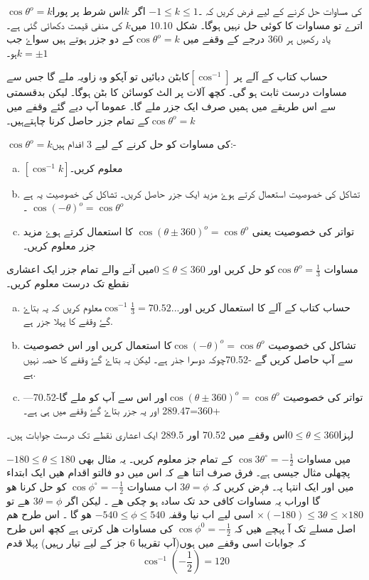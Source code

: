 \(\cos \theta^o = k\)کی مساوات حل کرنے کے لیے فرض کریں کہ ۔\(-1 \leq k \leq 1\)
 اگر \(k\)اس شرط پر پورا اترے تو مساوات کا کوئی حل نہیں ہوگا۔ شکل 10.10 میں\(k\) کی منفی قیمت دکھائی گئی ہے۔ یاد رکھیں ہر 360 درجے کے وقفے میں \(\cos \theta^o = k\)کے دو جزر ہوتے ہیں سواۓ جب \(k= \pm 1\)ہو۔

حساب کتاب کے آلے پر \([\cos^{-1}]\)کابٹن دبائیں تو آپکو وہ زاویہ ملے گا جس سے مساوات درست ثابت ہو گی۔ کچھ آلات پر الٹ کوسائن کا بٹن ہوگا۔ لیکن بدقسمتی سے اس طریقے میں ہمیں صرف ایک جزر ملے گا۔ عموما آپ  دیے گئے وقفے میں  \(\cos \theta^o = k\)کے تمام جزر حاصل کرنا چاہتےہیں۔

 \(\cos \theta^o = k\)کی مساوات کو حل کرنے کے لیے 3 افدام ہیں:-

\begin{enumerate}[a.]
\item
\([\cos^{-1}k]\)معلوم کریں۔
\item
 تشاکل کی خصوصیت استعمال کرتے ہوۓ مزید ایک جزر حاصل کریں۔ تشاکل کی خصوصیت یہ ہے
 \(\cos (-\theta)^o=\cos \theta^o\) ۔

\item
 تواتر کی خصوصیت یعنی \(\cos (\theta \pm 360)^o = \cos \theta^o\) کا استعمال کرتے ہوۓ مزید جزر معلوم کریں۔
\end{enumerate}

مساوات \(\cos \theta^o =\frac{1}{3}\)کو حل کریں اور \(0 \leq \theta \leq 360\)میں آنے والے تمام جزر ایک اعشاری نقطع تک درست معلوم کریں۔


\begin{enumerate}[a.]
\item
حساب کتاب کے آلے کا استعمال کریں اور\(\cos^{-1} \frac{1}{3}= 70.52...\)معلوم کریں کہ یہ بتاۓ گۓ وقفے کا پہلا جزر ہے.
\item
تشاکل کی خصوصیت \(\cos (-\theta)^o=\cos \theta^o\)کا استعمال کریں اور اس خصوصیت سے آپ حاصل کریں گے -70.52چوکہ دوسرا جذر ہے۔ لیکن یہ بتاۓ گۓ وقفے کا حصہ نہیں ہے.
\item
تواتر کی خصوصیت \(\cos (\theta \pm 360)^o = \cos \theta^o\)اور اس سے آپ کو ملے گا-70.52---+360=289.47 اور یہ جزر بتاۓ گۓ وقفے میں ہی ہے۔
\end{enumerate}
لہزا\(0 \leq \theta \leq 360\)اس وقفے میں 70.52 اور 289.5 ایک اعشاری نقطے تک درست جوابات ہیں۔ 





 \( -180\leq \theta\leq180 \)
میں مساوات
 \( \cos 3\theta^{\circ} =-\frac{1}{2}\)
 کے تمام جز معلوم کریں۔ یہ مثال بھی پچھلی مثال جیسی ہے۔ فرق صرف اتنا ھے کہ اس میں دو فالتو اقدام ھیں ایک ابتداء میں اور ایک انتہا پہ۔
فرٖٖض کریں  کہ
\( 3\theta=\phi\) 
 اب مساوات
\(\cos \phi^{\circ} = -\frac{1}{2} \) 
کو حل کرنا ھو گا اوراب یہ مساوات کافی حد تک سادہ ہو چکی ھے ۔ لیکن اگر
\( 3\theta=\phi\) 
ھے  تو 
\(\times\left(-180\right)\leq3\theta\leq\times180\)
 اسی لیے اب نیا وقفہ 
\( -540\leq\phi\leq 540 \) 
ھو گا ۔ اس طرح ھم اصل مسلے تک آ پہچے ھیں کہ
 \( \cos\phi^{0} =-\frac{1}{2} \)
 کی مساوات ھل کرتی ہے کچھ اس طرح کہ جوابات اسی وقفے میں ہوں(آپ تقریبا 6 جز کے لیے تیار رہیں)
پہلا قدم
\[ \cos^{-1}( -\frac{1}{2} )=120 \]

